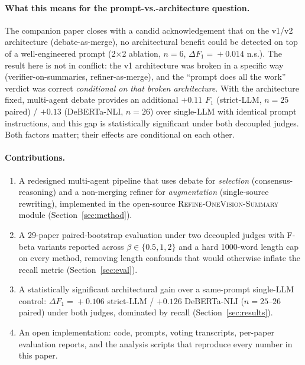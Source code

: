 \documentclass[11pt,a4paper]{article}
\begin{document}
\paragraph{What this means for the prompt-vs.-architecture question.}
The companion paper closes with a candid acknowledgement that on the
v1/v2 architecture (debate-as-merge), no architectural benefit could
be detected on top of a well-engineered prompt
(2$\times$2 ablation, $n=6$, $\Delta F_1\!=\!+0.014$ n.s.). The
result here is not in conflict: the v1 architecture was broken in a
specific way (verifier-on-summaries, refiner-as-merge), and the
``prompt does all the work'' verdict was correct \emph{conditional
on that broken architecture}. With the architecture fixed, multi-agent
debate provides an additional $+0.11$ $F_1$ (strict-LLM, $n=25$
paired) / $+0.13$ (DeBERTa-NLI, $n=26$) over single-LLM with
identical prompt instructions, and this gap is statistically
significant under both decoupled judges. Both factors matter; their
effects are conditional on each other.

\paragraph{Contributions.}
\begin{enumerate}[leftmargin=*,topsep=2pt,itemsep=1pt]
    \item A redesigned multi-agent pipeline that uses debate for
          \emph{selection} (consensus-reasoning) and a non-merging
          refiner for \emph{augmentation} (single-source rewriting),
          implemented in the open-source
          \textsc{Refine-OneVision-Summary} module
          (Section~\ref{sec:method}).
    \item A 29-paper paired-bootstrap evaluation under two decoupled
          judges with F-beta variants reported across $\beta \in
          \{0.5, 1, 2\}$ and a hard 1000-word length cap on every
          method, removing length confounds that would otherwise
          inflate the recall metric (Section~\ref{sec:eval}).
    \item A statistically significant architectural gain over a same-prompt
          single-LLM control: $\Delta F_1\!=\!+0.106$ strict-LLM /
          $+0.126$ DeBERTa-NLI ($n=25$--$26$ paired)
          under both judges, dominated by recall
          (Section~\ref{sec:results}).
    \item An open implementation: code, prompts, voting transcripts,
          per-paper evaluation reports, and the analysis scripts that
          reproduce every number in this paper.
\end{enumerate}
\end{document}

